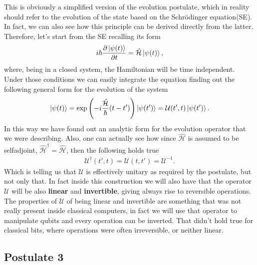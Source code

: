 
\noindent
This is obviously a simplified version of the evolution postulate, which in reality should refer to the evolution of the state based on the Schr\"odinger equation(SE). In fact, we can also see how this principle can be derived directly from the latter. Therefore, let's start from the SE recalling its form
\begin{equation}
    \label{eq:SchEque}
    i\hbar\pdv{\ket{\psi(t)}}{t} = \hat{\mathcal{H}}\ket{\psi(t)},
\end{equation}
where, being in a closed system, the Hamiltonian will be time independent. Under those conditions we can easily integrate the equation finding out the following general form for the evolution of the system
\begin{equation}
    \ket{\psi(t)} = \exp\left( -i\frac{\hat{\mathcal{H}}}{\hbar}(t-t') \right)\ket{\psi(t')} = \mathcal{U}(t', t)\ket{\psi(t')}.
\end{equation}
In this way we have found out an analytic form for the evolution operator that we were describing. Also, one can actually see how since $\hat{\mathcal{H}}$ is assumed to be selfadjoint, $\hat{\mathcal{H}}^\dagger = \hat{\mathcal{H}}$, then the following holds true
\begin{align}
    \mathcal{U}^\dagger(t', t) = \mathcal{U}(t, t') = \mathcal{U}^{-1}.
\end{align}
Which is telling us that $\mathcal{U}$ is effectively unitary as required by the postulate, but not only that. In fact inside this construction we will also have that the operator $\mathcal{U}$ will be also \textbf{linear} and \textbf{invertible}, giving always rise to reversible operations.
\nt
{
    The properties of $\mathcal{U}$ of being linear and invertible are something that was not really present inside classical computers, in fact we will use that operator to manipulate qubits and every operation can be inverted. That didn't hold true for classical bits, where operations were often irreversible, or neither linear.
}

\subsection{Postulate 3}

